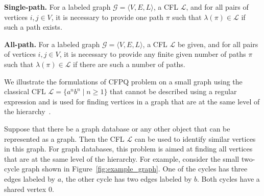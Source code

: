 \textbf{Single-path.} For a labeled graph $\mathcal{G} = \langle V, E, L \rangle$, a CFL $\mathcal{L}$, and for all pairs of vertices $i, j \in V$, it is necessary to provide one path $\pi$ such that $\lambda(\pi) \in \mathcal{L}$ if such a path exists.

\textbf{All-path.} For a labeled graph $\mathcal{G} = \langle V, E, L \rangle$, a CFL $\mathcal{L}$ be given, and for all pairs of vertices $i, j \in V$, it is necessary to provide any finite given number of paths $\pi$ such that $\lambda(\pi) \in \mathcal{L}$ if there are such a number of paths.

We illustrate the formulations of CFPQ problem on a small graph using the classical CFL $\mathcal{L} = \{a^nb^n \mid n \geq 1\}$ that cannot be described using a regular expression and is used for finding vertices in a graph that are at the same level of the hierarchy~\cite{abiteboul1995foundations}.

Suppose that there be a graph database or any other object that can be represented as a graph. Then the CFL $\mathcal{L}$ can be used to identify similar vertices in this graph. For graph databases, this problem is aimed at finding all vertices that are at the same level of the hierarchy. For example, consider the small two-cycle graph shown in Figure~\ref{fig:example_graph}. One of the cycles has three edges labeled by $a$, the other cycle has two edges labeled by $b$. Both cycles have a shared vertex $0$.

